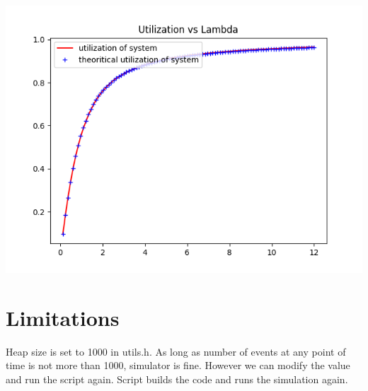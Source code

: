 \documentclass[11pt]{article}
\begin{document}
 \includegraphics{Utilization_L10_K4_M4_U3}
 
 \section{Limitations}
 Heap size is set to 1000 in utils.h. As long as number of events at any point of time is not more than 1000, simulator is fine. However we can modify the value and run the script again. Script builds the code and runs the simulation again.
\end{document}
